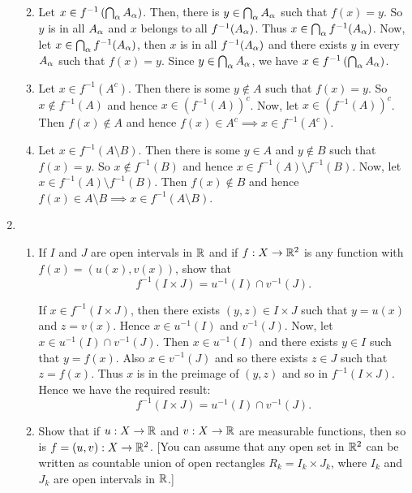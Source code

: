 \documentclass[12pt]{article}
\begin{document}
\begin{enumerate}
\begin{mybox}
\begin{enumerate}
  \vspace*{2mm}
  \item Let $x\in f^{-1}\left(\bigcap_{\alpha} A_{\alpha}\right)$.
  Then, there is $y\in \bigcap_{\alpha} A_{\alpha}$ such that
  $f(x)=y$. So $y$ is in all $A_{\alpha}$ and $x$ belongs to all
  $f^{-1}(A_{\alpha})$. Thus $x\in
  \bigcap_{\alpha}f^{-1}(A_{\alpha})$. Now, let $x\in \bigcap_{\alpha}
  f^{-1}(A_{\alpha})$, then $x$ is in all $f^{-1}(A_{\alpha})$
  and there exists $y$ in every $A_{\alpha}$ such that $f(x)=y$.
  Since $y\in \bigcap_{\alpha} A_{\alpha}$, we have
  $x\in f^{-1}\left(\bigcap_{\alpha} A_{\alpha}\right)$.

  \vspace*{2mm}
  \item Let $x\in f^{-1}(A^c)$. Then there is some $y\notin A$
  such that $f(x)=y$. So $x\notin f^{-1}(A)$ and hence
  $x\in (f^{-1}(A))^c$. Now, let $x\in (f^{-1}(A))^c$. Then
  $f(x)\notin A$ and hence $f(x)\in A^c\implies x\in f^{-1}
  (A^c)$.

  \vspace*{2mm}
  \item Let $x\in f^{-1}(A\setminus B)$.
  Then there is some $y\in A$ and $y\notin B$
  such that $f(x)=y$. So $x\notin f^{-1}(B)$ and hence
  $x\in f^{-1}(A)\setminus f^{-1}(B)$.
  Now, let $x\in f^{-1}(A)\setminus f^{-1}(B)$. Then
  $f(x)\notin B$ and hence $f(x)\in A\setminus B
  \implies x\in f^{-1}
  (A\setminus B)$.
\end{enumerate}
\end{mybox}


\item
\begin{enumerate}
\item If $I$ and $J$ are open intervals in $\mathbb{R}$ and
if $f: X \to \mathbb{R}^2$ is any function with $f(x) = (u(x), v(x))$,
show that $$f^{-1}(I \times J) = u^{-1}(I) \cap v^{-1}(J).$$
\begin{mybox}

If $x\in f^{-1}(I\times J)$, then there exists $(y,z)
\in I\times J$ such that $y=u(x)$ and $z=v(x)$. Hence
$x\in u^{-1}(I)$ and $v^{-1}(J)$. Now, let $x\in
u^{-1}(I) \cap v^{-1}(J)$. Then $x\in u^{-1}(I)$ and there exists
$y\in I$ such that $y=f(x)$. Also $x\in v^{-1}(J)$ and so there
exists $z\in J$ such that $z=f(x)$. Thus $x$ is in the preimage
of $(y,z)$ and so in $f^{-1}(I\times J)$. Hence we have the
required result:
$$f^{-1}(I \times J) = u^{-1}(I) \cap v^{-1}(J).$$ 
\end{mybox}

\item Show that if $u: X \to \mathbb{R}$ and  $v: X \to \mathbb{R}$
are measurable functions, then so is $f = (u,v): X \to \mathbb{R}^2$.
[You can assume that any open set in $\mathbb{R}^2$ can be written
as countable union of open rectangles $R_k = I_k \times J_k$,
where $I_k$ and $J_k$ are open intervals in $\mathbb{R}$.]
\end{enumerate} 
\begin{mybox}
  

\end{mybox}
\end{enumerate}
\end{document}
